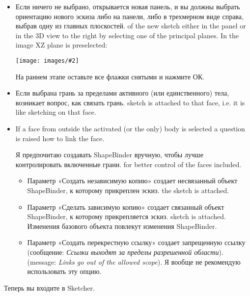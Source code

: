 \documentclass[12pt,titlepage]{article}
\newcommand{\img}[2]{\vspace{2ex}\noindent\texttt{[image: images/\#2]}}
\begin{document}
\begin{itemize}
\item Если ничего не выбрано, открывается новая панель, и вы должны выбрать ориентацию нового эскиза либо на панели, либо в трехмерном виде справа, выбрав одну из главных плоскостей.
      of the new sketch either in the panel or in the 3D view to the right by selecting one
      of the principal planes. In the image XZ plane is preselected:

\img{width=0.45\textwidth}{Origin}

На раннем этапе оставьте все флажки снятыми и нажмите ОК.
\item Если выбрана грань за пределами активного (или единственного) тела, возникает вопрос, как связать грань.
      sketch is attached to that face, i.e. it is like sketching on that face.
\item If a face from outside the activated (or the only) body is selected a
      question is raised how to link the face.

      Я предпочитаю создавать ShapeBinder вручную, чтобы лучше контролировать включенные грани. 
      for better control of the faces included.
      \begin{itemize}
      \item Параметр «Создать независимую копию» создает несвязанный объект ShapeBinder, к которому прикреплен эскиз.
            the sketch is attached.
      \item Параметр «Сделать зависимую копию» создает связанный объект ShapeBinder, к которому прикрепляется эскиз.
            sketch is attached. Изменения базового объекта повлекут изменения ShapeBinder.
      \item Параметр «Создать перекрестную ссылку» создает запрещенную ссылку (сообщение: {\em Ссылки выходят за пределы разрешенной области}). 
            (message: {\em Links go out of the allowed scope}). 
            Я вообще не рекомендую использовать эту опцию.
      \end{itemize}
\end{itemize}

Теперь вы входите в Sketcher.
\end{document}
